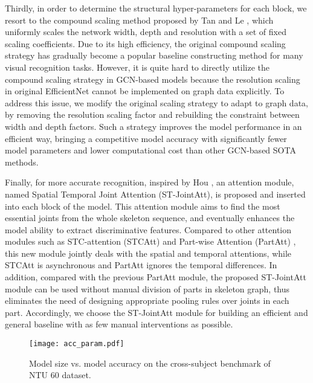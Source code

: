 \documentclass[10pt,journal,compsoc]{IEEEtran}
\begin{document}
Thirdly, in order to determine the structural hyper-parameters for each block, we resort to the compound scaling method proposed by Tan and Le \cite{tan2019efficientnet}, which uniformly scales the network width, depth and resolution with a set of fixed scaling coefficients. Due to its high efficiency, the original compound scaling strategy has gradually become a popular baseline constructing method for many visual recognition tasks. However, it is quite hard to directly utilize the compound scaling strategy in GCN-based models because the resolution scaling in original EfficientNet \cite{tan2019efficientnet} cannot be implemented on graph data explicitly. To address this issue, we modify the original scaling strategy to adapt to graph data, by removing the resolution scaling factor and rebuilding the constraint between width and depth factors. Such a strategy improves the model performance in an efficient way, bringing a competitive model accuracy with significantly fewer model parameters and lower computational cost than other GCN-based SOTA methods.

Finally, for more accurate recognition, inspired by Hou \etal \cite{hou2021coordinate}, an attention module, named Spatial Temporal Joint Attention (ST-JointAtt), is proposed and inserted into each block of the model. This attention module aims to find the most essential joints from the whole skeleton sequence, and eventually enhances the model ability to extract discriminative features. Compared to other attention modules such as STC-attention (STCAtt) \cite{shi2020skeleton} and Part-wise Attention (PartAtt) \cite{song2020stronger}, this new module jointly deals with the spatial and temporal attentions, while STCAtt is asynchronous and PartAtt ignores the temporal differences. In addition, compared with the previous PartAtt module, the proposed ST-JointAtt module can be used without manual division of parts in skeleton graph, thus eliminates the need of designing appropriate pooling rules over joints in each part. Accordingly, we choose the ST-JointAtt module for building an efficient and general baseline with as few manual interventions as possible.

\begin{figure}[t]
  \centerline{\texttt{[image: acc\_param.pdf]}}
  \vspace{-0.4cm}
  \caption{Model size vs. model accuracy on the cross-subject benchmark of NTU 60 dataset. \bv}\label{fig:acc_param}
  \vspace{-0.4cm}
\end{figure}
\end{document}
